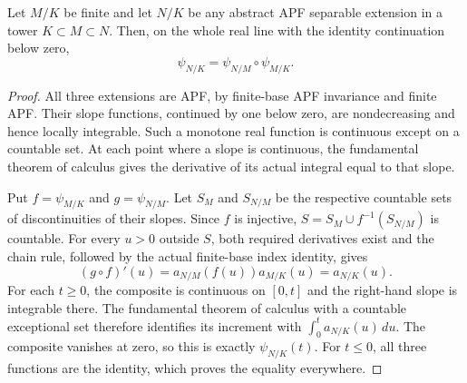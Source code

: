 \begin{proposition}
\label{fw:apf-finite-base-herbrand}
\leanok
Let $M/K$ be finite and let $N/K$ be any abstract APF separable
extension in a tower $K\subset M\subset N$. Then, on the whole real
line with the identity continuation below zero,
\[
 \psi_{N/K}=\psi_{N/M}\circ\psi_{M/K}.
\]
\end{proposition}
\begin{proof}
All three extensions are APF, by finite-base APF invariance and finite
APF. Their slope functions, continued by one below zero, are
nondecreasing and hence locally integrable. Such a monotone real
function is continuous except on a countable set. At each point where
a slope is continuous, the fundamental theorem of calculus gives the
derivative of its actual integral equal to that slope.

Put $f=\psi_{M/K}$ and $g=\psi_{N/M}$. Let $S_M$ and $S_{N/M}$ be
the respective countable sets of discontinuities of their slopes.
Since $f$ is injective, $S=S_M\cup f^{-1}(S_{N/M})$ is countable.
For every $u>0$ outside $S$, both required derivatives exist and the
chain rule, followed by the actual finite-base index identity, gives
\[
 (g\circ f)'(u)=a_{N/M}(f(u))a_{M/K}(u)=a_{N/K}(u).
\]
For each $t\geq0$, the composite is continuous on $[0,t]$ and the
right-hand slope is integrable there. The fundamental theorem of
calculus with a countable exceptional set therefore identifies its
increment with $\int_0^t a_{N/K}(u)\,du$. The composite vanishes at
zero, so this is exactly $\psi_{N/K}(t)$. For $t\leq0$, all three
functions are the identity, which proves the equality everywhere.
\end{proof}

